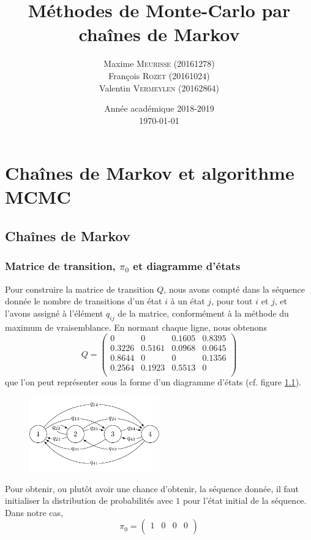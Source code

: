 \documentclass[a4paper, 12pt]{report}
\title{Méthodes de Monte-Carlo par chaînes de Markov}
\author{Maxime \textsc{Meurisse} (20161278)\\François \textsc{Rozet} (20161024)\\Valentin \textsc{Vermeylen} (20162864)\\}
\date{Année académique 2018-2019\\\today}
\def\MCMC{MCMC}
\begin{document}
	
	\chapter{Chaînes de Markov et algorithme \MCMC}
	\section{Chaînes de Markov}
	\subsection{Matrice de transition, $\pi_0$ et diagramme d'états}
	Pour construire la matrice de transition $Q$, nous avons compté dans la séquence donnée le nombre de transitions d'un état $i$ à un état $j$, pour tout $i$ et $j$, et l'avons assigné à l'élément $q_{ij}$ de la matrice, conformément à la méthode du maximum de vraisemblance. En normant chaque ligne, nous obtenons
	\begin{equation}
	    Q =
	    \begin{pmatrix}
	        0 & 0 & \num{0.1605} & \num{0.8395} \\
	        \num{0.3226} & \num{0.5161} & \num{0.0968} & \num{0.0645} \\
	        \num{0.8644} & 0 & 0 & \num{0.1356} \\
	        \num{0.2564} & \num{0.1923} & \num{0.5513} & 0 \\
	    \end{pmatrix}
	\end{equation}
	que l'on peut représenter sous la forme d'un diagramme d'états (cf. figure \ref{fig:diagramme}).
	\begin{figure}[H]
	    \centering
	    \includegraphics[width=0.5\textwidth]{resources/tikz/diagram/diagram.pdf}
	    \label{fig:diagramme}
	\end{figure}
    Pour obtenir, ou plutôt avoir une chance d'obtenir, la séquence donnée, il faut initialiser la distribution de probabilités avec $1$ pour l'état initial de la séquence. Dans notre cas,
    \begin{equation}
	    \pi_0 =
	    \begin{pmatrix}
	        \num{1} & \num{0} & \num{0} & \num{0} \\
	    \end{pmatrix}
	\end{equation}
\end{document}
